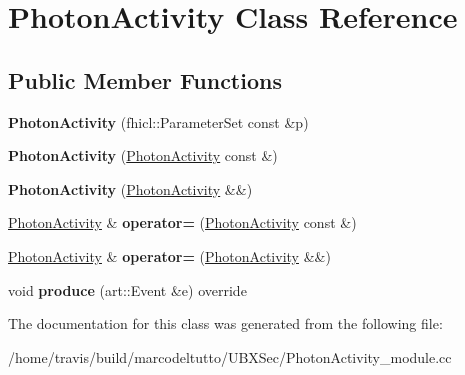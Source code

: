 \hypertarget{classPhotonActivity}{\section{\-Photon\-Activity \-Class \-Reference}
\label{classPhotonActivity}
}
\subsection*{\-Public \-Member \-Functions}
\begin{DoxyCompactItemize}
\item 
\hypertarget{classPhotonActivity_a76dfd63b90435e0b7ec3b74ee15f7ac2}{{\bfseries \-Photon\-Activity} (fhicl\-::\-Parameter\-Set const \&p)}\label{classPhotonActivity_a76dfd63b90435e0b7ec3b74ee15f7ac2}

\item 
\hypertarget{classPhotonActivity_aa6a5ff7c79512a83324a80b5a31c2d07}{{\bfseries \-Photon\-Activity} (\hyperlink{classPhotonActivity}{\-Photon\-Activity} const \&)}\label{classPhotonActivity_aa6a5ff7c79512a83324a80b5a31c2d07}

\item 
\hypertarget{classPhotonActivity_a34da9119cff858250180159f4fcaf187}{{\bfseries \-Photon\-Activity} (\hyperlink{classPhotonActivity}{\-Photon\-Activity} \&\&)}\label{classPhotonActivity_a34da9119cff858250180159f4fcaf187}

\item 
\hypertarget{classPhotonActivity_a7cf8b5b10a1f5ab6cccb432531124951}{\hyperlink{classPhotonActivity}{\-Photon\-Activity} \& {\bfseries operator=} (\hyperlink{classPhotonActivity}{\-Photon\-Activity} const \&)}\label{classPhotonActivity_a7cf8b5b10a1f5ab6cccb432531124951}

\item 
\hypertarget{classPhotonActivity_a12aba7c001a7263b0ff8f1871b94a445}{\hyperlink{classPhotonActivity}{\-Photon\-Activity} \& {\bfseries operator=} (\hyperlink{classPhotonActivity}{\-Photon\-Activity} \&\&)}\label{classPhotonActivity_a12aba7c001a7263b0ff8f1871b94a445}

\item 
\hypertarget{classPhotonActivity_ab28c536cfa704815226ef9b8f7632694}{void {\bfseries produce} (art\-::\-Event \&e) override}\label{classPhotonActivity_ab28c536cfa704815226ef9b8f7632694}

\end{DoxyCompactItemize}


\-The documentation for this class was generated from the following file\-:\begin{DoxyCompactItemize}
\item 
/home/travis/build/marcodeltutto/\-U\-B\-X\-Sec/\-Photon\-Activity\-\_\-module.\-cc\end{DoxyCompactItemize}

